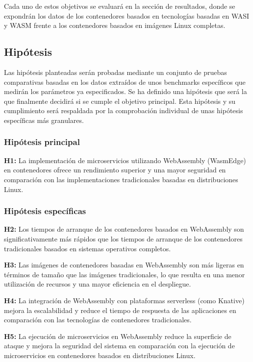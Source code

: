 Cada uno de estos objetivos se evaluará en la sección de resultados, donde se expondrán los datos de los contenedores basados en tecnologías basadas en WASI y WASM frente a los contenedores basados en imágenes Linux completas.

\subsection{Hipótesis}

Las hipótesis planteadas serán probadas mediante un conjunto de pruebas comparativas basadas en los datos extraídos de unos benchmarks específicos que medirán los parámetros ya especificados. Se ha definido una hipótesis que será la que finalmente decidirá si se cumple el objetivo principal. Esta hipótesis y su cumplimiento será respaldada por la comprobación individual de unas hipótesis específicas más granulares.

\subsubsection{Hipótesis principal}

\textbf{H1:} La implementación de microservicios utilizando WebAssembly (WasmEdge) en contenedores ofrece un rendimiento superior y una mayor seguridad en comparación con las implementaciones tradicionales basadas en distribuciones Linux.

\subsubsection{Hipótesis específicas}

\textbf{H2:} Los tiempos de arranque de los contenedores basados en WebAssembly son significativamente más rápidos que los tiempos de arranque de los contenedores tradicionales basados en sistemas operativos completos.

\textbf{H3:} Las imágenes de contenedores basadas en WebAssembly son más ligeras en términos de tamaño que las imágenes tradicionales, lo que resulta en una menor utilización de recursos y una mayor eficiencia en el despliegue.

\textbf{H4:} La integración de WebAssembly con plataformas serverless (como Knative) mejora la escalabilidad y reduce el tiempo de respuesta de las aplicaciones en comparación con las tecnologías de contenedores tradicionales.

\textbf{H5:} La ejecución de microservicios en WebAssembly reduce la superficie de ataque y mejora la seguridad del sistema en comparación con la ejecución de microservicios en contenedores basados en distribuciones Linux.

